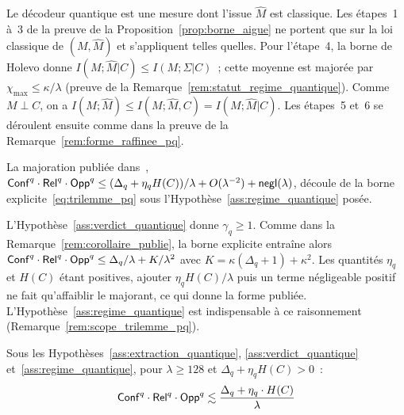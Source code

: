 \begin{sloppypar}
\begin{Preuve}
Le d\'ecodeur quantique est une mesure dont l'issue $\hat M$ est classique. Les
\'etapes~1 \`a~3 de la preuve de la Proposition~\ref{prop:borne_aigue} ne portent que sur
la loi classique de $(M,\hat M)$ et s'appliquent telles quelles. Pour l'\'etape~4, la
borne de Holevo donne $I(M;\hat M|C) \leq I(M;\Sigma|C)$~; cette moyenne est major\'ee
par $\chi_{\max} \leq \kappa/\lambda$ (preuve de la
Remarque~\ref{rem:statut_regime_quantique}). Comme $M \perp C$, on a
$I(M;\hat M) \leq I(M;\hat M, C) = I(M;\hat M|C)$. Les \'etapes~5 et~6 se d\'eroulent
ensuite comme dans la preuve de la Remarque~\ref{rem:forme_raffinee_pq}.
\end{Preuve}

\begin{remark}
\label{rem:corollaire_publie_pq}
La majoration publi\'ee dans~\cite{MINKA2026PQCRO},
$\mathsf{Conf}^q \cdot \mathsf{Rel}^q \cdot \mathsf{Opp}^q \leq (\Delta_q + \eta_q H(C))/\lambda + O(\lambda^{-2}) + \mathsf{negl}(\lambda)$,
d\'ecoule de la borne explicite~\eqref{eq:trilemme_pq} sous
l'Hypoth\`ese~\ref{ass:regime_quantique} pos\'ee.
\end{remark}

\begin{Preuve}
L'Hypoth\`ese~\ref{ass:verdict_quantique} donne
$\gamma_q \geq 1$. Comme dans la Remarque~\ref{rem:corollaire_publie}, la borne explicite
entra\^ine alors $\mathsf{Conf}^q \cdot \mathsf{Rel}^q \cdot \mathsf{Opp}^q \leq \Delta_q/\lambda + K/\lambda^2$ avec
$K = \kappa(\Delta_q+1) + \kappa^2$. Les quantit\'es $\eta_q$ et $H(C)$ \'etant positives,
ajouter $\eta_q H(C)/\lambda$ puis un terme n\'egligeable positif ne fait qu'affaiblir le
majorant, ce qui donne la forme publi\'ee. L'Hypoth\`ese~\ref{ass:regime_quantique} est
indispensable \`a ce raisonnement (Remarque~\ref{rem:scope_trilemme_pq}).
\end{Preuve}

\begin{corollary}\label{cor:forme_simplifiee_pq}
Sous les Hypoth\`eses~\ref{ass:extraction_quantique}, \ref{ass:verdict_quantique}
et~\ref{ass:regime_quantique}, pour $\lambda \geq 128$ et
$\Delta_q + \eta_q H(C) > 0$~:
\begin{equation}
\mathsf{Conf}^q \cdot \mathsf{Rel}^q \cdot \mathsf{Opp}^q \lesssim \frac{\Delta_q + \eta_q \cdot H(C)}{\lambda}
\label{eq:trilemme_pq_simplifie}
\end{equation}
\end{corollary}


\end{sloppypar}
